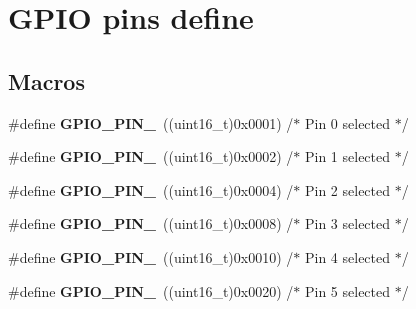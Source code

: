 \hypertarget{group___g_p_i_o__pins__define}{}\section{G\+P\+IO pins define}
\label{group___g_p_i_o__pins__define}
\subsection*{Macros}
\begin{DoxyCompactItemize}
\item 
\mbox{\label{group___g_p_i_o__pins__define_ga176efbf43a259b7bb0a85a47401505be}} 
\#define {\bfseries G\+P\+I\+O\+\_\+\+P\+I\+N\+\_}~((uint16\+\_\+t)0x0001)  /$\ast$ Pin 0 selected    $\ast$/
\item 
\mbox{\label{group___g_p_i_o__pins__define_ga6c35af4e75c3cb57bb650feaa7a136b5}} 
\#define {\bfseries G\+P\+I\+O\+\_\+\+P\+I\+N\+\_}~((uint16\+\_\+t)0x0002)  /$\ast$ Pin 1 selected    $\ast$/
\item 
\mbox{\label{group___g_p_i_o__pins__define_ga6eee38b797a7268f04357dfa2759efd2}} 
\#define {\bfseries G\+P\+I\+O\+\_\+\+P\+I\+N\+\_}~((uint16\+\_\+t)0x0004)  /$\ast$ Pin 2 selected    $\ast$/
\item 
\mbox{\label{group___g_p_i_o__pins__define_gadcaf899c018a0dde572b5af783565c62}} 
\#define {\bfseries G\+P\+I\+O\+\_\+\+P\+I\+N\+\_}~((uint16\+\_\+t)0x0008)  /$\ast$ Pin 3 selected    $\ast$/
\item 
\mbox{\label{group___g_p_i_o__pins__define_gab3871e35868deecd260e586ad70d4b83}} 
\#define {\bfseries G\+P\+I\+O\+\_\+\+P\+I\+N\+\_}~((uint16\+\_\+t)0x0010)  /$\ast$ Pin 4 selected    $\ast$/
\item 
\mbox{\label{group___g_p_i_o__pins__define_ga01cc9ed93f6fd12fd3403362779aaa18}} 
\#define {\bfseries G\+P\+I\+O\+\_\+\+P\+I\+N\+\_}~((uint16\+\_\+t)0x0020)  /$\ast$ Pin 5 selected    $\ast$/
\item 
\mbox{\label{group___g_p_i_o__pins__define_ga9089f18f20ec88ee38ce6f27389e6d7e}} 

\end{DoxyCompactItemize}

